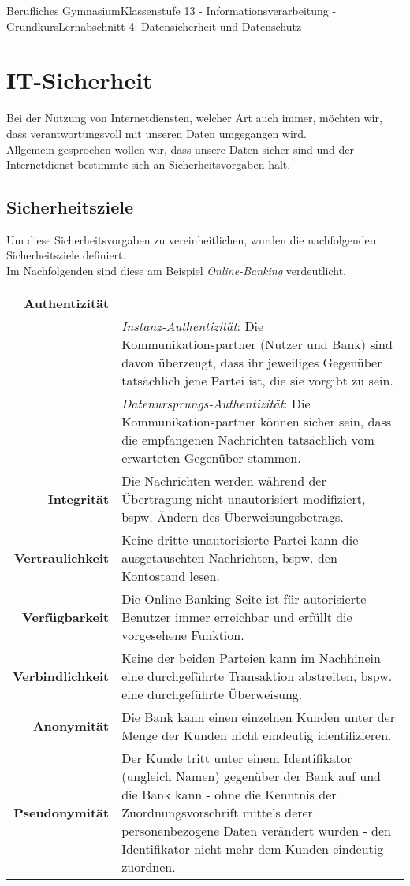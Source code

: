\documentclass[11pt,oneside,openany,headings=optiontotoc,11pt,numbers=noenddot]{article}
\begin{document}
	\begin{worksheet}{Berufliches Gymnasium}{Klassenstufe 13 - Informationsverarbeitung - Grundkurs}{Lernabschnitt 4: Datensicherheit und Datenschutz}
		\setlength{\columnseprule}{0pt}
		\setcounter{section}{3}
		\setcounter{page}{25}
		\section{IT-Sicherheit}
		Bei der Nutzung von Internetdiensten, welcher Art auch immer, möchten wir, dass verantwortungsvoll mit unseren Daten umgegangen wird.\\
		Allgemein gesprochen wollen wir, dass unsere Daten sicher sind und der Internetdienst bestimmte sich an Sicherheitsvorgaben hält.
		\subsection{Sicherheitsziele}
		Um diese Sicherheitsvorgaben zu vereinheitlichen, wurden die nachfolgenden Sicherheitsziele definiert.\\
		\small{Im Nachfolgenden sind diese am Beispiel \textit{Online-Banking} verdeutlicht.}\\
		\par\noindent
		\renewcommand{\arraystretch}{1.5}
		\begin{tabularx}{\textwidth}{rX}
			\textbf{Authentizität} &\\
			& \textit{Instanz-Authentizität}: Die Kommunikationspartner (Nutzer und Bank) sind davon überzeugt, dass ihr jeweiliges Gegenüber tatsächlich jene Partei ist, die sie vorgibt zu sein.\\
			& \textit{Datenursprungs-Authentizität}: Die Kommunikationspartner können sicher sein, dass die empfangenen Nachrichten tatsächlich vom \grqq{}erwarteten\grqq{} Gegenüber stammen.\\
			\textbf{Integrität} & Die Nachrichten werden während der Übertragung nicht unautorisiert modifiziert, bspw. Ändern des Überweisungsbetrags.\\
			\textbf{Vertraulichkeit} & Keine dritte unautorisierte Partei kann die ausgetauschten Nachrichten, bspw. den Kontostand lesen.\\
			\textbf{Verfügbarkeit}&  Die Online-Banking-Seite ist für autorisierte Benutzer \grqq{}immer\grqq{} erreichbar und erfüllt die vorgesehene Funktion.\\
			\textbf{Verbindlichkeit} & Keine der beiden Parteien kann im Nachhinein eine durchgeführte Transaktion abstreiten, bspw. eine durchgeführte Überweisung.\\
			\textbf{Anonymität} & Die Bank kann einen einzelnen Kunden unter der Menge der Kunden nicht eindeutig identifizieren.\\
			\textbf{Pseudonymität} & Der Kunde tritt unter einem Identifikator (ungleich Namen) gegenüber der Bank auf und die Bank kann - ohne die Kenntnis der Zuordnungsvorschrift mittels derer personenbezogene Daten verändert wurden - den Identifikator nicht mehr dem Kunden eindeutig zuordnen.
		\end{tabularx}

\end{worksheet}
\end{document}

